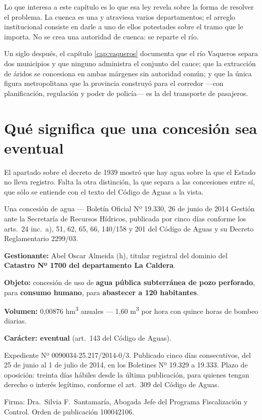 Lo que interesa a este capítulo es lo que esa ley revela sobre la forma de resolver el
problema. La cuenca es una y atraviesa varios departamentos; el arreglo institucional
consiste en darle a uno de ellos potestades sobre el tramo que le importa. No se crea una
autoridad de cuenca: se reparte el río.

Un siglo después, el capítulo \ref{cap:vaqueros} documenta que el río Vaqueros separa dos municipios y que
ninguno administra el conjunto del cauce; que la extracción de áridos se concesiona en
ambas márgenes sin autoridad común; y que la única figura metropolitana que la provincia
construyó para el corredor —con planificación, regulación y poder de policía— es la del
transporte de pasajeros.

\section{Qué significa que una concesión sea eventual}

El apartado sobre el decreto de 1939 mostró que hay agua sobre la que el Estado no lleva registro. Falta la
otra distinción, la que separa a las concesiones entre sí, que sólo se entiende con
el texto del Código de Aguas a la vista.

\begin{ficha}{Una concesión de agua --- Boletín Oficial Nº 19.330, 26 de junio de 2014}
Gestión ante la Secretaría de Recursos Hídricos, publicada por cinco días conforme los arts.\ 24 inc.\ a), 51, 62, 65, 66, 140/158 y 201 del Código de Aguas y su Decreto Reglamentario 2299/03.

\textbf{Gestionante:} Abel Oscar Almeida (h), titular registral del dominio del \textbf{Catastro Nº 1700 del departamento La Caldera}.

\textbf{Objeto:} concesión de uso de \textbf{agua pública subterránea de pozo perforado}, para \textbf{consumo humano}, para \textbf{abastecer a 120 habitantes}.

\textbf{Volumen:} 0,00876 hm\textsuperscript{3} anuales --- 1,60 m\textsuperscript{3} por hora con quince horas de bombeo diarias.

\textbf{Carácter: eventual} (art.\ 143 del Código de Aguas).

Expediente Nº 0090034-25.217/2014-0/3. Publicado cinco días consecutivos, del 25 de junio al 1 de julio de 2014, en los Boletines Nº 19.329 a 19.333. Plazo de oposición: treinta días hábiles desde la última publicación, para quienes tengan derecho o interés legítimo, conforme el art.\ 309 del Código de Aguas.

Firma: Dra.\ Silvia F.\ Santamaría, Abogada Jefe del Programa Fiscalización y Control. Orden de publicación 100042106.
\end{ficha}

